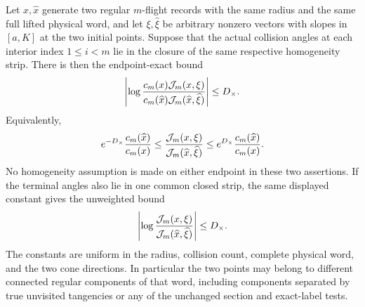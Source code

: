 \begin{theorem}
\label{thm:xd-cross-distortion}
Let $x,\widehat x$ generate two regular $m$-flight records with the
same radius and the same full lifted physical word, and let
$\xi,\widehat\xi$ be arbitrary nonzero vectors with slopes in
$[a,K]$ at the two initial points.  Suppose that the actual collision
angles at each interior index $1\le i<m$ lie in the closure of the
same respective homogeneity strip.  There is then the endpoint-exact bound
\begin{equation}\label{eq:xd-weighted-distortion}
 \left|\log{c_m(x)\mathcal J_m(x,\xi)
              \over c_m(\widehat x)\mathcal J_m(\widehat x,\widehat\xi)}
                                                        \right|
 \le D_\times.
\end{equation}
Equivalently,
\begin{equation}\label{eq:xd-endpoint-residual}
 e^{-D_\times}{c_m(\widehat x)\over c_m(x)}
 \le {\mathcal J_m(x,\xi)\over
             \mathcal J_m(\widehat x,\widehat\xi)}
 \le e^{D_\times}{c_m(\widehat x)\over c_m(x)}.
\end{equation}
No homogeneity assumption is made on either endpoint in these two
assertions.  If the terminal angles also lie in one common closed strip,
the same displayed constant gives the unweighted bound
\begin{equation}\label{eq:xd-unweighted-distortion}
 \left|\log{\mathcal J_m(x,\xi)
                   \over\mathcal J_m(\widehat x,\widehat\xi)}\right|
                                                         \le D_\times.
\end{equation}
The constants are uniform in the radius, collision count, complete
physical word, and the two cone directions.  In particular the two
points may belong to different connected regular components of that
word, including components separated by true unvisited tangencies
or any of the unchanged section and exact-label tests.
\end{theorem}

